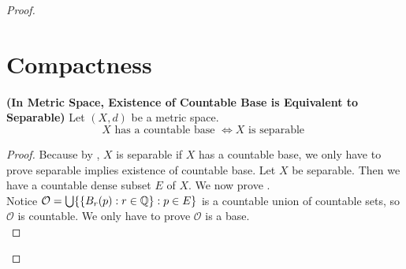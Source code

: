 \documentclass{report}
\begin{document}
\begin{proof}
\section{Compactness}
\begin{theorem}
\label{3.5.1}
\textbf{(In Metric Space, Existence of Countable Base is Equivalent to Separable)} Let $(X,d)$ be a metric space. 
\begin{equation}
X\text{ has a countable base }\iff  X\text{ is separable }
\end{equation}
\end{theorem}
\begin{proof}
Because by , $X$ is separable if  $X$ has a countable base, we only have to prove separable implies existence of countable base. Let $X$ be separable. Then we have a countable dense subset $E$ of $X$. We now prove
.\\

Notice $\mathcal{O}=\bigcup \{ \{ B_r(p):r\in\mathbb{Q} \}:p\in E \}$ is a countable union of countable sets, so $\mathcal{O}$ is countable. We only have to prove $\mathcal{O}$ is a base.\\


\end{proof}
\end{proof}
\end{document}
